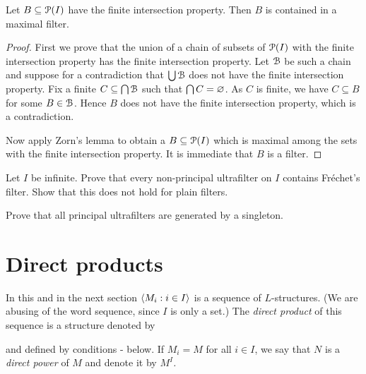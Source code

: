 \begin{proposition}\label{esistenzamassimale1}
Let $B\subseteq\P(I)$ have the finite intersection property. 
Then $B$ is contained in a maximal filter.
\end{proposition}

\begin{proof}
First we prove that the union of a chain of subsets of $\P(I)$ with the finite intersection property has the finite intersection property.
Let $\B$ be such a chain and suppose for a contradiction that $\bigcup\B$ does not have the finite intersection property. Fix a finite $C\subseteq\bigcap\B$ such that $\bigcap  C=\0$.
As $C$ is finite, we have $C\subseteq B$ for some $B\in\B$.
Hence $B$ does not have the finite intersection property, which is a contradiction.


Now apply Zorn's lemma to obtain a $B\subseteq\P(I)$ which is maximal among the sets with the finite intersection property. It is immediate that $B$ is a filter.
\end{proof}

\begin{exercise}
  Let $I$ be infinite. Prove that every non-principal ultrafilter on $I$ contains Fr\'echet's filter. 
  Show that this does not hold for plain filters. 
\end{exercise}
  
\begin{exercise}
Prove that all principal ultrafilters are generated by a singleton.
\end{exercise}



\section{Direct products}
\label{prodottidiretti}

In this and in the next section $\<M_i:i\in I\>$ is a sequence of $L$-structures. (We are abusing of the word sequence, since $I$ is only a set.) The \emph{direct product\/} of this sequence is a structure denoted by

\smallskip

and defined by conditions - below. If $M_i=M$ for all $i\in I$, we say that $N$ is a \emph{direct power\/} of $M$ and denote it by \emph{$M^I$.}

